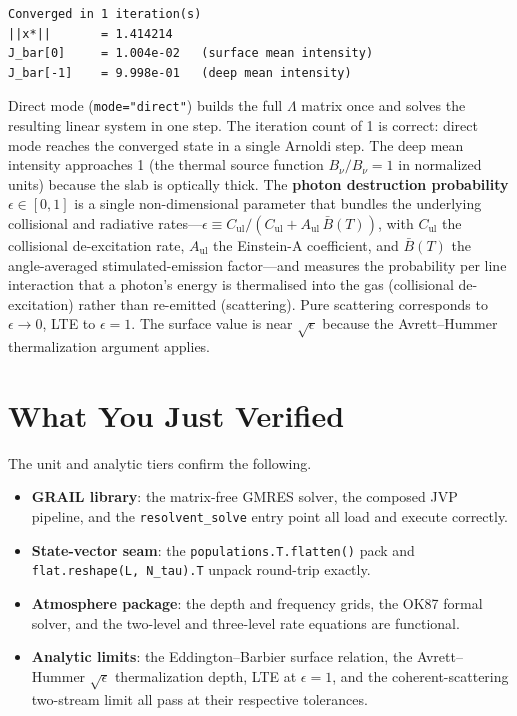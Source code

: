 \begin{lstlisting}[style=grailOutStyle]
Converged in 1 iteration(s)
||x*||       = 1.414214
J_bar[0]     = 1.004e-02   (surface mean intensity)
J_bar[-1]    = 9.998e-01   (deep mean intensity)
\end{lstlisting}

Direct mode (\texttt{mode="direct"}) builds the full $\Lambda$ matrix once
and solves the resulting linear system in one step.
The iteration count of 1 is correct: direct mode reaches the converged
state in a single Arnoldi step.
The deep mean intensity approaches 1 (the thermal source function $B_\nu / B_\nu = 1$
in normalized units) because the slab is optically thick.
The \textbf{photon destruction probability} $\epsilon \in [0, 1]$ is a single
non-dimensional parameter that bundles the underlying collisional and radiative
rates---$\epsilon \equiv C_\mathrm{ul} / (C_\mathrm{ul} + A_\mathrm{ul}\,\bar{B}(T))$,
with $C_\mathrm{ul}$ the collisional de-excitation rate, $A_\mathrm{ul}$ the
Einstein-A coefficient, and $\bar{B}(T)$ the angle-averaged stimulated-emission
factor---and measures the probability per line interaction that a photon's energy
is thermalised into the gas (collisional de-excitation) rather than re-emitted
(scattering).  Pure scattering corresponds to $\epsilon \to 0$, LTE to
$\epsilon = 1$.
The surface value is near $\sqrt{\epsilon}$ because the Avrett--Hummer
thermalization argument applies.

\section{What You Just Verified}
\label{sec:verified}

The unit and analytic tiers confirm the following.

\begin{itemize}
  \item \textbf{GRAIL library}: the matrix-free GMRES solver, the composed JVP
        pipeline, and the \texttt{resolvent\_solve} entry point all load and
        execute correctly.
  \item \textbf{State-vector seam}: the \texttt{populations.T.flatten()} pack
        and \texttt{flat.reshape(L, N\_tau).T} unpack round-trip exactly.
  \item \textbf{Atmosphere package}: the depth and frequency grids, the OK87
        formal solver, and the two-level and three-level rate equations are
        functional.
  \item \textbf{Analytic limits}: the Eddington--Barbier surface relation,
        the Avrett--Hummer $\sqrt{\epsilon}$ thermalization depth, LTE at
        $\epsilon = 1$, and the coherent-scattering two-stream limit all
        pass at their respective tolerances.
\end{itemize}

